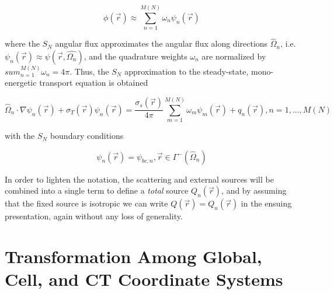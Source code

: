 \begin{equation}
    \phi (\Vec{r} ) \approx \sum_{n=1}^{M(N)} \omega_n \psi_n ( \Vec{r} )
\end{equation}

\noindent where the $S_N$ angular flux approximates the angular flux along directions $\hat{\Omega}_n$, i.e. $\psi_n ( \Vec{r} ) \approx \psi ( \Vec{r} , \hat{\Omega_n} ) $, and the quadrature weights $\omega_n$ are normalized by $sum_{n=1}^{M(N)} \omega_n = 4 \pi$. Thus, the $S_N$ approximation to the steady-state, mono-energetic transport equation is obtained

\begin{equation}
    \hat{\Omega}_n  \cdot \nabla \psi_n ( \Vec{r} ) + \sigma_T (\Vec{r}) \psi_n ( \Vec{r} ) = \frac{\sigma_s ( \Vec{r} )}{4 \pi} \sum_{m=1}^{M(N)} \omega_m \psi_m ( \Vec{r} ) + q_n (\Vec{r}), n=1,...,M(N)
\end{equation}

\noindent with the $S_N$ boundary conditions

\begin{equation}
    \psi_n ( \Vec{r} ) = \psi_{bc,n}, \Vec{r} \in \Gamma^- ( \hat{\Omega}_n )
\end{equation}

In order to lighten the notation, the scattering and external sources will be combined into a single term to define a \textit{total} source $Q_n ( \vec{r})$, and by assuming that the fixed source is isotropic we can write $Q ( \vec{r} ) = Q_n ( \vec{r})$ in the ensuing presentation, again without any loss of generality.

\section{Transformation Among Global, Cell, and CT Coordinate Systems}


